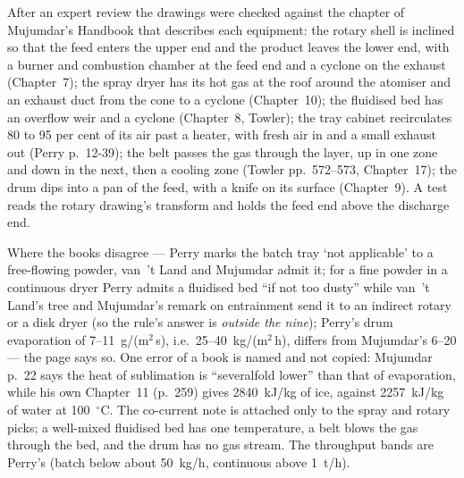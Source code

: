 \documentclass[11pt,a4paper]{article}
\begin{document}
After an expert review the drawings were checked against the chapter of
Mujumdar's Handbook that describes each equipment: the rotary shell is inclined
so that the feed enters the upper end and the product leaves the lower end,
with a burner and combustion chamber at the feed end and a cyclone on the
exhaust (Chapter~7); the spray dryer has its hot gas at the roof around the
atomiser and an exhaust duct from the cone to a cyclone (Chapter~10); the
fluidised bed has an overflow weir and a cyclone (Chapter~8, Towler); the tray
cabinet recirculates 80 to 95 per cent of its air past a heater, with fresh air
in and a small exhaust out (Perry p.~12-39); the belt passes the gas through
the layer, up in one zone and down in the next, then a cooling zone (Towler
pp.~572--573, Chapter~17); the drum dips into a pan of the feed, with a knife
on its surface (Chapter~9).  A test reads the rotary drawing's transform and
holds the feed end above the discharge end.

Where the books disagree --- Perry marks the batch tray `not applicable' to a
free-flowing powder, van~'t Land and Mujumdar admit it; for a fine powder in a
continuous dryer Perry admits a fluidised bed ``if not too dusty'' while van~'t
Land's tree and Mujumdar's remark on entrainment send it to an indirect rotary
or a disk dryer (so the rule's answer is \emph{outside the nine}); Perry's
drum evaporation of 7--11~g/(m$^2$\,s), i.e.\ 25--40~kg/(m$^2$\,h), differs
from Mujumdar's 6--20 --- the page says so.  One error of a book is named and
not copied: Mujumdar p.~22 says the heat of sublimation is ``severalfold lower''
than that of evaporation, while his own Chapter~11 (p.~259) gives
2840~kJ/kg of ice, against 2257~kJ/kg of water at 100~$^\circ$C.  The
co-current note is attached only to the spray and rotary picks; a well-mixed
fluidised bed has one temperature, a belt blows the gas through the bed, and the
drum has no gas stream.  The throughput bands are Perry's (batch below about
50~kg/h, continuous above 1~t/h).
\end{document}
